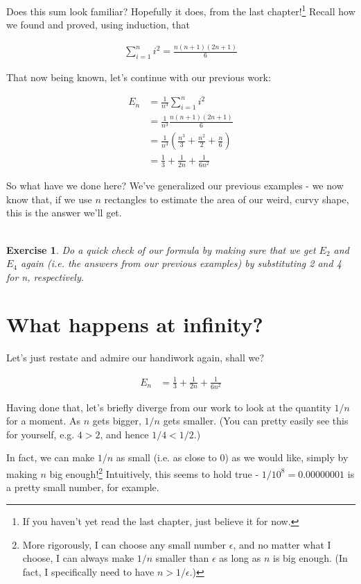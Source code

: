 \documentclass{article}
\newtheorem{exercise}{\\ \bf Exercise}
\begin{document}
Does this sum look familiar? Hopefully it does, from the last chapter!\footnote{If you haven't yet read the last chapter, just believe it for now.} Recall how we found and proved, using induction, that 

\begin{align*}
\sum_{i=1}^n i^2 = \frac{n(n+1)(2n+1)}{6}
\end{align*}

That now being known, let's continue with our previous work:


\begin{align*}
E_n &= \frac{1}{n^3} \sum_{i=1}^n i^2 \\
&= \frac{1}{n^3} \frac{n(n+1)(2n+1)}{6} \\
&= \frac{1}{n^3} \left( \frac{n^3}{3} + \frac{n^2}{2} + \frac{n}{6} \right) \\
&= \frac{1}{3} + \frac{1}{2n} + \frac{1}{6n^2}
\end{align*}

So what have we done here? We've generalized our previous examples - we now know that, if we use $n$ rectangles to estimate the area of our weird, curvy shape, this is the answer we'll get.

\begin{exercise}
Do a quick check of our formula by making sure that we get $E_2$ and $E_4$ again (i.e. the answers from our previous examples) by substituting 2 and 4 for n, respectively.
\end{exercise}


\section{What happens at infinity?}

Let's just restate and admire our handiwork again, shall we?


\begin{align*}
E_n &= \frac{1}{3} + \frac{1}{2n} + \frac{1}{6n^2}
\end{align*}

Having done that, let's briefly diverge from our work to look at the quantity $1/n$ for a moment. As $n$ gets bigger, $1/n$ gets smaller. (You can pretty easily see this for yourself, e.g. $4 > 2$, and hence $1/4 < 1/2$.) 

In fact, we can make $1/n$ as small (i.e. as close to 0) as we would like, simply by making $n$ big enough!\footnote{More rigorously, I can choose any small number $\epsilon$, and no matter what I choose, I can always make $1/n$ smaller than $\epsilon$ as long as $n$ is big enough. (In fact, I specifically need to have $n > 1/\epsilon$.)} Intuitively, this seems to hold true - $1/10^8 = 0.00000001$ is a pretty small number, for example.
\end{document}
